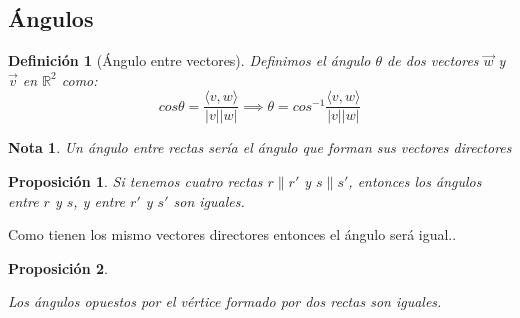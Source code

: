 \documentclass[11pt, a4paper]{article}
\makeatletter
\newif\IfInSansMode
\let\oldsf\sffamily
\renewcommand*{\sffamily}{\oldsf\mathversion{sans}\InSansModetrue}
\let\oldnorm\normalfont
\renewcommand*{\normalfont}{\oldnorm\InSansModefalse\mathversion{normal}}
\renewenvironment{proof}[1][\proofname] {\vspace{-15pt}\par\pushQED{\qed}\normalfont\topsep6\p@\@plus6\p@\relax\trivlist\item[\hskip\labelsep\it#1\@addpunct{.}]\ignorespaces}{\popQED\endtrivlist\@endpefalse}
\newcommand{\R}{\mathbb{R}}
\renewcommand{\vec}{\overrightarrow}
\renewenvironment{proof}[1][\proofname] {\par\pushQED{\qed}\normalfont\topsep6\p@\@plus6\p@\relax\trivlist\item[\hskip\labelsep\itshape\sffamily#1\@addpunct{.}]\ignorespaces}{\popQED\endtrivlist\@endpefalse}
\theoremstyle{theorem-style}
\newtheorem{nprop}{Proposición}[section]
\theoremstyle{definition-style}
\newtheorem{ndef}{Definición}[section]
\theoremstyle{remark-style}
\newtheorem*{nota}{Nota}
\theoremstyle{example-style}
\makeatother
\begin{document}
\subsection{Ángulos}

\begin{ndef}[Ángulo entre vectores]
  Definimos el ángulo $\theta$ de dos vectores $\vec{w}$ y $\vec{v}$ en $\R^2$ como:
  \[
    cos \theta =  \frac{\langle  v,w \rangle }{|v||w|} \implies \theta = cos^{-1} \frac{\langle  v,w \rangle }{|v||w|}
  \]
\end{ndef} 
\begin{nota}
  Un ángulo entre rectas sería el ángulo que forman sus vectores directores
\end{nota}

\begin{nprop}
  Si tenemos cuatro rectas $r \parallel r'$ y $s \parallel s'$, entonces los ángulos entre $r$ y $s$, y entre $r'$ y $s'$ son iguales.
\end{nprop}

\begin{proof}
	Como tienen los mismo vectores directores entonces el ángulo será igual..
\end{proof}

\begin{nprop}\hfill\\
  \begin{minipage}[c]{0.65\textwidth}
    Los ángulos opuestos por el vértice formado por dos rectas son iguales.
  \end{minipage}\hfill
  \begin{minipage}{0.30\textwidth}

  \end{minipage}
\end{nprop}
\end{document}
